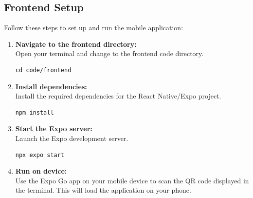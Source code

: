 \subsection{Frontend Setup}
Follow these steps to set up and run the mobile application:

\begin{enumerate}
    \item \textbf{Navigate to the frontend directory:} \\
    Open your terminal and change to the frontend code directory.
    \begin{verbatim}
cd code/frontend
    \end{verbatim}

    \item \textbf{Install dependencies:} \\
    Install the required dependencies for the React Native/Expo project.
    \begin{verbatim}
npm install
    \end{verbatim}

    \item \textbf{Start the Expo server:} \\
    Launch the Expo development server.
    \begin{verbatim}
npx expo start
    \end{verbatim}

    \item \textbf{Run on device:} \\
    Use the Expo Go app on your mobile device to scan the QR code displayed in the terminal. This will load the application on your phone.
\end{enumerate}
